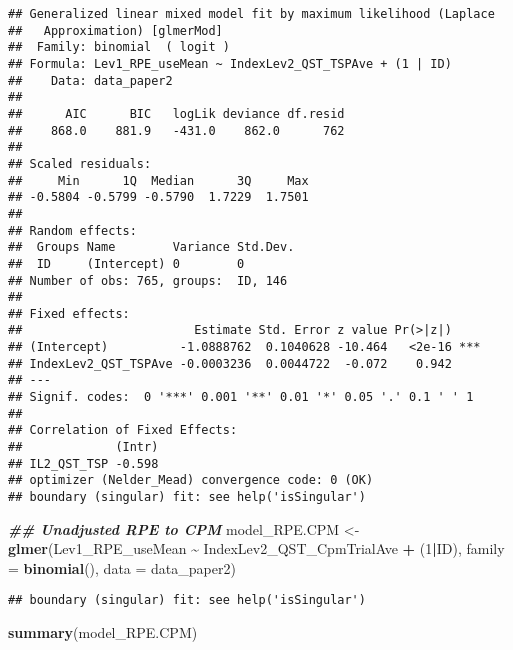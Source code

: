 \documentclass[
  12pt,
]{article}
\newenvironment{Shaded}{\begin{snugshade}}{\end{snugshade}}
\newcommand{\AttributeTok}[1]{\textcolor[rgb]{0.13,0.29,0.53}{#1}}
\newcommand{\DecValTok}[1]{\textcolor[rgb]{0.00,0.00,0.81}{#1}}
\newcommand{\DocumentationTok}[1]{\textcolor[rgb]{0.56,0.35,0.01}{\textbf{\textit{#1}}}}
\newcommand{\FunctionTok}[1]{\textcolor[rgb]{0.13,0.29,0.53}{\textbf{#1}}}
\newcommand{\NormalTok}[1]{#1}
\newcommand{\OtherTok}[1]{\textcolor[rgb]{0.56,0.35,0.01}{#1}}
\newcommand{\SpecialCharTok}[1]{\textcolor[rgb]{0.81,0.36,0.00}{\textbf{#1}}}
\begin{document}
\begin{verbatim}
## Generalized linear mixed model fit by maximum likelihood (Laplace
##   Approximation) [glmerMod]
##  Family: binomial  ( logit )
## Formula: Lev1_RPE_useMean ~ IndexLev2_QST_TSPAve + (1 | ID)
##    Data: data_paper2
## 
##      AIC      BIC   logLik deviance df.resid 
##    868.0    881.9   -431.0    862.0      762 
## 
## Scaled residuals: 
##     Min      1Q  Median      3Q     Max 
## -0.5804 -0.5799 -0.5790  1.7229  1.7501 
## 
## Random effects:
##  Groups Name        Variance Std.Dev.
##  ID     (Intercept) 0        0       
## Number of obs: 765, groups:  ID, 146
## 
## Fixed effects:
##                        Estimate Std. Error z value Pr(>|z|)    
## (Intercept)          -1.0888762  0.1040628 -10.464   <2e-16 ***
## IndexLev2_QST_TSPAve -0.0003236  0.0044722  -0.072    0.942    
## ---
## Signif. codes:  0 '***' 0.001 '**' 0.01 '*' 0.05 '.' 0.1 ' ' 1
## 
## Correlation of Fixed Effects:
##             (Intr)
## IL2_QST_TSP -0.598
## optimizer (Nelder_Mead) convergence code: 0 (OK)
## boundary (singular) fit: see help('isSingular')
\end{verbatim}

\begin{Shaded}
\begin{Highlighting}[]
\DocumentationTok{\#\# Unadjusted RPE to CPM}
\NormalTok{model\_RPE.CPM }\OtherTok{\textless{}{-}} \FunctionTok{glmer}\NormalTok{(Lev1\_RPE\_useMean }\SpecialCharTok{\textasciitilde{}}\NormalTok{ IndexLev2\_QST\_CpmTrialAve }\SpecialCharTok{+}\NormalTok{ (}\DecValTok{1}\SpecialCharTok{|}\NormalTok{ID), }\AttributeTok{family =} \FunctionTok{binomial}\NormalTok{(), }\AttributeTok{data =}\NormalTok{ data\_paper2)}
\end{Highlighting}
\end{Shaded}

\begin{verbatim}
## boundary (singular) fit: see help('isSingular')
\end{verbatim}

\begin{Shaded}
\begin{Highlighting}[]
\FunctionTok{summary}\NormalTok{(model\_RPE.CPM)}
\end{Highlighting}
\end{Shaded}
\end{document}
